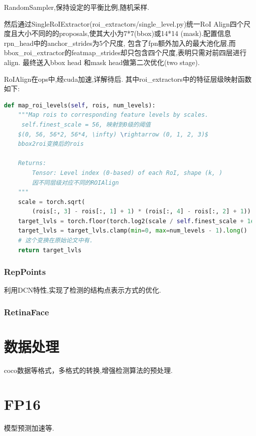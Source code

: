 \documentclass[UTF8]{ctexart}
\begin{document}
RandomSampler,保持设定的平衡比例,随机采样.

然后通过SingleRoIExtractor(roi\_extractors/single\_level.py)统一RoI
Align四个尺度且大小不同的的proposals,使其大小为7*7(bbox)或14*14
(mask).配置信息rpn\_head中的anchor\_strides为5个尺度,
包含了fpn额外加入的最大池化层,而bbox\_roi\_extractor的featmap\_strides却只包含四个尺度,表明只需对前四层进行align.
最终送入bbox head 和mask head做第二次优化(two stage).

RoIAlign在ops中,经cuda加速,详解待后.
其中roi\_extractors中的特征层级映射函数如下:
\lstset{style=mystyle}
\begin{lstlisting}[language=Python]
	def map_roi_levels(self, rois, num_levels):
	"""Map rois to corresponding feature levels by scales.
	 self.finest_scale = 56, 映射到0级的阈值
	$(0, 56, 56*2, 56*4, \infty) \rightarrow (0, 1, 2, 3)$
	bbox2roi变换后的rois

	Returns:
		Tensor: Level index (0-based) of each RoI, shape (k, )
		因不同层级对应不同的ROIAlign
	"""
	scale = torch.sqrt(
		(rois[:, 3] - rois[:, 1] + 1) * (rois[:, 4] - rois[:, 2] + 1))
	target_lvls = torch.floor(torch.log2(scale / self.finest_scale + 1e-6))
	target_lvls = target_lvls.clamp(min=0, max=num_levels - 1).long()
	# 这个变换在原始论文中有.
	return target_lvls
\end{lstlisting}

\subsubsection{RepPoints}
	利用DCN特性,实现了检测的结构点表示方式的优化.

\subsubsection{RetinaFace}


\section{数据处理}
\label{sec:detail}
coco数据等格式，多格式的转换,增强检测算法的预处理.


\section{FP16}
模型预测加速等.
\end{document}
